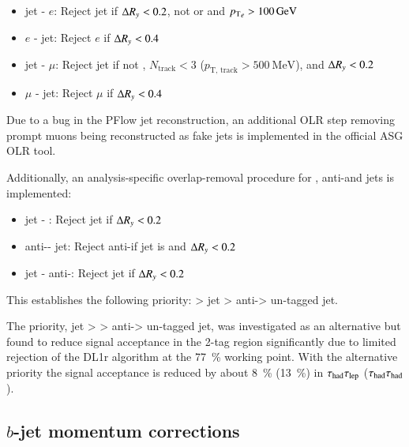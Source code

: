 \begin{itemize}
\item jet - $e$: Reject jet if $\Delta R_y < 0.2$, not \btagged or \btagged and
  ${\pT}_{e} > \SI{100}{\GeV}$
\item $e$ - jet: Reject $e$ if $\Delta R_y < 0.4$

\item jet - $\mu$: Reject jet if not \btagged, $N_\text{track} < 3$ ($p_\text{T,
  track} > \SI{500}{\MeV}$), and $\Delta R_y < 0.2$
\item $\mu$ - jet: Reject $\mu$ if $\Delta R_y < 0.4$
\end{itemize}
Due to a bug in the PFlow jet reconstruction, an additional OLR step removing
prompt muons being reconstructed as fake jets is implemented in the official ASG
OLR tool.

Additionally, an analysis-specific overlap-removal procedure for \tauhadvis,
anti-\tauhadvis and jets is implemented:
\begin{itemize}
\item jet - \tauhadvis: Reject jet if $\Delta R_y < 0.2$
\item anti-\tauhadvis - jet: Reject anti-\tauhad if jet is \btagged and $\Delta R_y <
  0.2$
\item jet - anti-\tauhadvis: Reject jet  if $\Delta R_y < 0.2$
\end{itemize}
This establishes the following priority: \tauhadvis > \btagged jet >
anti-\tauhadvis > un-tagged jet.

The priority, \btagged jet > \tauhadvis > anti-\tauhadvis > un-tagged jet, was
investigated as an alternative but found to reduce signal acceptance in the
2-tag region significantly due to limited \tauhad rejection of the DL1r \btag
algorithm at the \SI{77}{\percent} working point. With the alternative priority
the signal acceptance is reduced by about \SI{8}{\percent} (\SI{13}{\percent})
in $\tau_{\text{had}}\tau_{\text{lep}}$ ($\tau_{\text{had}}\tau_{\text{had}}$).







\subsection{$b$-jet momentum corrections}
\label{sec:bjet_momentum_corrections}


